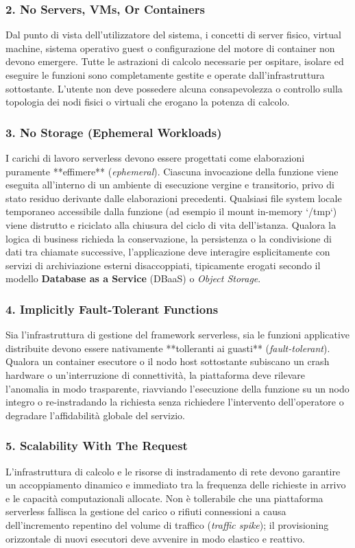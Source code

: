 \documentclass[11pt, a4paper]{article}
\begin{document}
\subsubsection{2. No Servers, VMs, Or Containers}
Dal punto di vista dell'utilizzatore del sistema, i concetti di server fisico, virtual machine, sistema operativo guest o configurazione del motore di container non devono emergere. Tutte le astrazioni di calcolo necessarie per ospitare, isolare ed eseguire le funzioni sono completamente gestite e operate dall'infrastruttura sottostante. L'utente non deve possedere alcuna consapevolezza o controllo sulla topologia dei nodi fisici o virtuali che erogano la potenza di calcolo.

\subsubsection{3. No Storage (Ephemeral Workloads)}
I carichi di lavoro serverless devono essere progettati come elaborazioni puramente **effimere** (\emph{ephemeral}). Ciascuna invocazione della funzione viene eseguita all'interno di un ambiente di esecuzione vergine e transitorio, privo di stato residuo derivante dalle elaborazioni precedenti. Qualsiasi file system locale temporaneo accessibile dalla funzione (ad esempio il mount in-memory `/tmp`) viene distrutto e riciclato alla chiusura del ciclo di vita dell'istanza. Qualora la logica di business richieda la conservazione, la persistenza o la condivisione di dati tra chiamate successive, l'applicazione deve interagire esplicitamente con servizi di archiviazione esterni disaccoppiati, tipicamente erogati secondo il modello \textbf{Database as a Service} (DBaaS) o \emph{Object Storage}.

\subsubsection{4. Implicitly Fault-Tolerant Functions}
Sia l'infrastruttura di gestione del framework serverless, sia le funzioni applicative distribuite devono essere nativamente **tolleranti ai guasti** (\emph{fault-tolerant}). Qualora un container esecutore o il nodo host sottostante subiscano un crash hardware o un'interruzione di connettività, la piattaforma deve rilevare l'anomalia in modo trasparente, riavviando l'esecuzione della funzione su un nodo integro o re-instradando la richiesta senza richiedere l'intervento dell'operatore o degradare l'affidabilità globale del servizio.

\subsubsection{5. Scalability With The Request}
L'infrastruttura di calcolo e le risorse di instradamento di rete devono garantire un accoppiamento dinamico e immediato tra la frequenza delle richieste in arrivo e le capacità computazionali allocate. Non è tollerabile che una piattaforma serverless fallisca la gestione del carico o rifiuti connessioni a causa dell'incremento repentino del volume di traffico (\emph{traffic spike}); il provisioning orizzontale di nuovi esecutori deve avvenire in modo elastico e reattivo.
\end{document}

